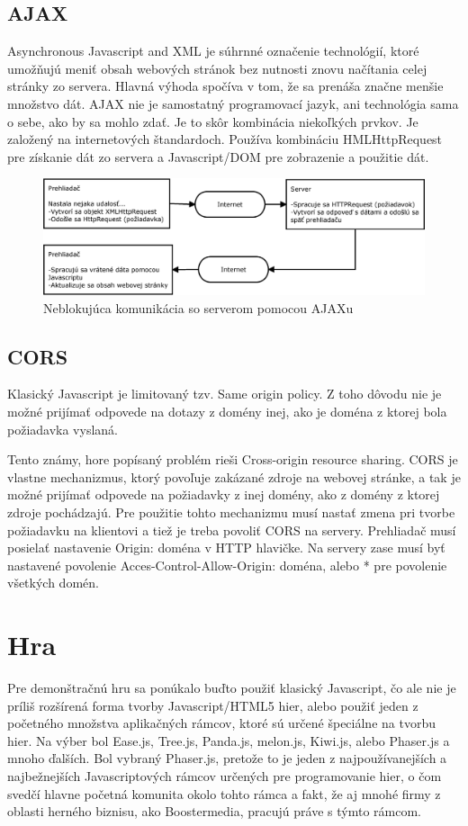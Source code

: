 \subsection{AJAX}
\label{sec:ajax}
Asynchronous Javascript and XML je súhrnné označenie technológií, ktoré umožňujú meniť obsah webových stránok bez nutnosti znovu načítania celej stránky zo servera. Hlavná výhoda spočíva v tom, že sa prenáša značne menšie množstvo dát. AJAX nie je samostatný programovací jazyk, ani technológia sama o sebe, ako by sa mohlo zdať. Je to skôr kombinácia niekoľkých prvkov. Je založený na internetových štandardoch. Používa kombináciu HMLHttpRequest pre získanie dát zo servera a Javascript/DOM pre zobrazenie a použitie dát.
\begin{figure}[h]
  \centering
  \includegraphics[scale=0.40]{fig/ajax.eps}
  \caption{Neblokujúca komunikácia so serverom pomocou AJAXu}
  \label{fig:ajax}
\end{figure}

\subsection{CORS}
\label{sec:cors}
Klasický Javascript je limitovaný tzv. Same origin policy. Z toho dôvodu nie je možné prijímať odpovede na dotazy z domény inej, ako je doména z ktorej bola požiadavka vyslaná.

Tento známy, hore popísaný problém rieši Cross-origin resource sharing. CORS je vlastne mechanizmus, ktorý povoľuje zakázané zdroje na webovej stránke, a tak je možné prijímať odpovede na požiadavky z inej domény, ako z domény z ktorej zdroje pochádzajú. Pre použitie tohto mechanizmu musí nastať zmena pri tvorbe požiadavku na klientovi a tiež je treba povoliť CORS na servery. Prehliadač musí posielať nastavenie Origin: doména v HTTP hlavičke. Na servery zase musí byť nastavené povolenie Acces-Control-Allow-Origin: doména, alebo * pre povolenie všetkých domén.

\section{Hra}
\label{sec:hra}
Pre demonštračnú hru sa ponúkalo buďto použiť klasický Javascript, čo ale nie je príliš rozšírená forma tvorby Javascript/HTML5 hier, alebo použiť jeden z početného množstva aplikačných rámcov, ktoré sú určené špeciálne na tvorbu hier. Na výber bol Ease.js, Tree.js, Panda.js, melon.js, Kiwi.js, alebo Phaser.js a mnoho ďalších. Bol vybraný Phaser.js, pretože to je jeden z najpoužívanejších a najbežnejších Javascriptových rámcov určených pre programovanie hier, o čom svedčí hlavne početná komunita okolo tohto rámca a fakt, že aj mnohé firmy z oblasti herného biznisu, ako Boostermedia, pracujú práve s týmto rámcom. 

